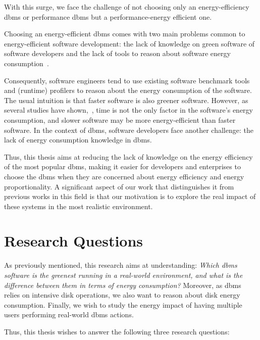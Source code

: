  With this surge, we face the challenge of not choosing only an energy-efficiency \gls{dbms} or performance \gls{dbms} but a performance-energy efficient one.
 

 Choosing an energy-efficient \gls{dbms} comes with two main problems common to energy-efficient software development: the lack of knowledge on green software of software developers and the lack of tools to reason about software energy consumption~\cite{10.1145/3154384,10.1145/2884781.2884810}. 

Consequently, software engineers tend to use existing software benchmark tools and (runtime) profilers to reason about the energy consumption of the software. The usual intuition is that faster software is also greener software. However, as several studies have shown,~\cite{10.1145/3125374.3125382},  time is not the only factor in the software's energy consumption, and slower software may be more energy-efficient than faster software. In the context of \gls{dbms}, software developers face another challenge: the lack of energy consumption knowledge in \gls{dbms}.



Thus, this thesis aims at reducing the lack of knowledge on the energy efficiency of the most popular \gls{dbms}, making it easier for developers and enterprises to choose the \gls{dbms} when they are concerned about energy efficiency and energy proportionality. A significant aspect of our work that distinguishes it from previous works in this field is that our motivation is to explore the real impact of these systems in the most realistic environment.


\section{Research Questions}
\label{sc:rq}


As previously mentioned, this research aims at understanding: \textit{Which \gls{dbms} software is the greenest running in a real-world environment, and what is the difference between them in terms of energy consumption?} Moreover, as \gls{dbms} relies on intensive disk operations, we also want to reason about disk energy consumption. Finally, we wish to study the energy impact of having multiple users performing real-world \gls{dbms} actions.

Thus, this thesis wishes to answer the following three research questions:


